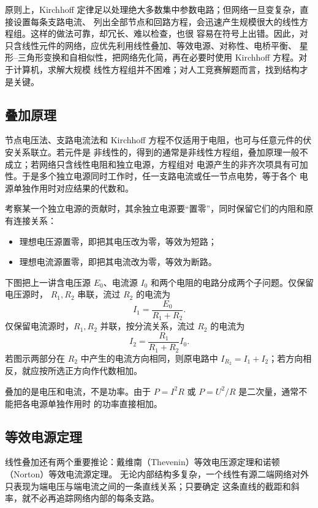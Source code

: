 原则上，Kirchhoff 定律足以处理绝大多数集中参数电路；但网络一旦变复杂，直接设置每条支路电流、
列出全部节点和回路方程，会迅速产生规模很大的线性方程组。这样的做法可靠，却冗长、难以检查，也很
容易在符号上出错。因此，对只含线性元件的网络，应优先利用线性叠加、等效电源、对称性、电桥平衡、
星形--三角形变换和自相似性，把网络先化简，再在必要时使用 Kirchhoff 方程。对于计算机，求解大规模
线性方程组并不困难；对人工竞赛解题而言，找到结构才是关键。

\subsection*{叠加原理}

节点电压法、支路电流法和 Kirchhoff 方程不仅适用于电阻，也可与任意元件的伏安关系联立。若元件是
非线性的，得到的通常是非线性方程组，叠加原理一般不成立；若网络只含线性电阻和独立电源，方程组对
电源产生的非齐次项具有可加性。于是多个独立电源同时工作时，任一支路电流或任一节点电势，等于各个
电源单独作用时对应结果的代数和。

考察某一个独立电源的贡献时，其余独立电源要“置零”，同时保留它们的内阻和原有连接关系：

\begin{itemize}
  \item 理想电压源置零，即把其电压改为零，等效为短路；
  \item 理想电流源置零，即把其电流改为零，等效为断路。
\end{itemize}

下图把上一讲含电压源 $E_0$、电流源 $I_0$ 和两个电阻的电路分成两个子问题。仅保留电压源时，
$R_1,R_2$ 串联，流过 $R_2$ 的电流为
\[
  I_1=\frac{E_0}{R_1+R_2}.
\]
仅保留电流源时，$R_1,R_2$ 并联，按分流关系，流过 $R_2$ 的电流为
\[
  I_2=\frac{R_1}{R_1+R_2}I_0.
\]
若图示两部分在 $R_2$ 中产生的电流方向相同，则原电路中
$I_{R_2}=I_1+I_2$；若方向相反，就应按所选正方向作代数相加。

\superpositionFigure
{}

叠加的是电压和电流，不是功率。由于 $P=I^2R$ 或 $P=U^2/R$ 是二次量，通常不能把各电源单独作用时
的功率直接相加。

\subsection*{等效电源定理}

线性叠加还有两个重要推论：戴维南（Thevenin）等效电压源定理和诺顿（Norton）等效电流源定理。
无论内部结构多复杂，一个线性有源二端网络对外只表现为端电压与端电流之间的一条直线关系；只要确定
这条直线的截距和斜率，就不必再追踪网络内部的每条支路。

